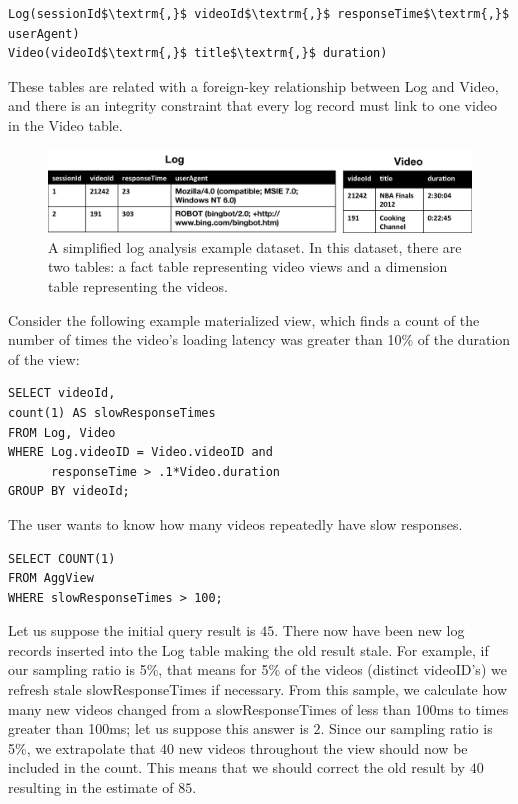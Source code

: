 \begin{lstlisting}[mathescape]
Log(sessionId$\textrm{,}$ videoId$\textrm{,}$ responseTime$\textrm{,}$ userAgent)
Video(videoId$\textrm{,}$ title$\textrm{,}$ duration)
\end{lstlisting}
These tables are related with a foreign-key relationship between
Log and Video, and there is an integrity constraint that every log
record must link to one video in the Video table.

\begin{figure}[ht!] 
\centering
\vspace{-0.75em}
 \includegraphics[width=\columnwidth]{figs/sample-clean-example.png}\vspace{-0.25em}
 \caption{A simplified log analysis example dataset. In this dataset, there are two tables: a fact table representing video views and a dimension table representing the videos.\label{example-1}}
\end{figure}

Consider the following example materialized view, which finds a count of the number of times the video's loading latency was greater than 10\% of the duration of the view:

\vspace{0.5em}

\begin{lstlisting} 
SELECT videoId, 
count(1) AS slowResponseTimes 
FROM Log, Video
WHERE Log.videoID = Video.videoID and
	  responseTime > .1*Video.duration
GROUP BY videoId;
\end{lstlisting}

The user wants to know how many videos repeatedly have slow responses.
\begin{lstlisting} 
SELECT COUNT(1)
FROM AggView
WHERE slowResponseTimes > 100;
\end{lstlisting}
Let us suppose the initial query result is $45$.
There now have been new log records inserted into the Log table making the old result stale.
For example, if our sampling ratio is 5\%, that means for 5\% of the videos (distinct videoID's) we refresh stale slowResponseTimes if necessary.
From this sample, we calculate how many new videos changed from a slowResponseTimes of less than 100ms to times greater than 100ms; let us suppose this answer is $2$.
Since our sampling ratio is 5\%, we extrapolate that $40$ new videos throughout the view should now be included in the count.
This means that we should correct the old result by $40$ resulting in the estimate of $85$.

